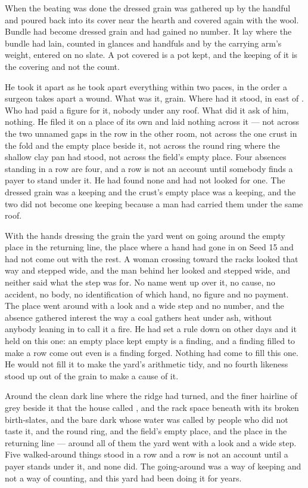When the beating was done the dressed grain was gathered up by the handful and poured back into its cover near the hearth and covered again with the wool. Bundle had become dressed grain and had gained no number. It lay where the bundle had lain, counted in glances and handfuls and by the carrying arm's weight, entered on no slate. A pot covered is a pot kept, and the keeping of it is the covering and not the count.

He took it apart as he took apart everything within two paces, in the order a surgeon takes apart a wound. What was it, grain. Where had it stood, in  east of . Who had paid a figure for it, nobody under any roof. What did it ask of him, nothing. He filed it on a place of its own and laid nothing across it --- not across the two unnamed gaps in the row in the other room, not across the one crust in the fold and the empty place beside it, not across the round ring where the shallow clay pan had stood, not across the field's empty place. Four absences standing in a row are four, and a row is not an account until somebody finds a payer to stand under it. He had found none and had not looked for one. The dressed grain was a keeping and the crust's empty place was a keeping, and the two did not become one keeping because a man had carried them under the same roof.

\scenebreak

With the hands dressing the grain the yard went on going around the empty place in the returning line, the place where a hand had gone in on Seed 15 and had not come out with the rest. A woman crossing toward the racks looked that way and stepped wide, and the man behind her looked and stepped wide, and neither said what the step was for. No name went up over it, no cause, no accident, no body, no identification of which hand, no figure and no payment. The place went around with a look and a wide step and no number, and the absence gathered interest the way a coal gathers heat under ash, without anybody leaning in to call it a fire. He had set a rule down on other days and it held on this one: an empty place kept empty is a finding, and a finding filled to make a row come out even is a finding forged. Nothing had come to fill this one. He would not fill it to make the yard's arithmetic tidy, and no fourth likeness stood up out of the grain to make a cause of it.

Around the clean dark line where the  ridge had turned, and the finer hairline of grey beside it that the house called , and the rack space beneath  with its broken birth-slates, and the bare dark  whose water was called  by people who did not taste it, and the round ring, and the field's empty place, and the place in the returning line --- around all of them the yard went with a look and a wide step. Five walked-around things stood in a row and a row is not an account until a payer stands under it, and none did. The going-around was a way of keeping and not a way of counting, and this yard had been doing it for years.

